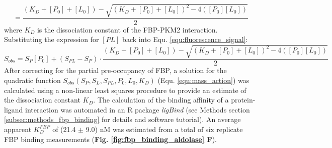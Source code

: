 %
%
\begin{equation}
[PL] = \frac{(K_{D} + [P_{0}] + [L_{0}]) - \sqrt{(K_{D} + [P_{0}] + [L_{0}])^{2} - 4([P_{0}] [L_{0}])}}{2}
\end{equation}
%
%
where $K_D$ is the dissociation constant of the FBP-PKM2 interaction. Substituting the expression for $[PL]$ back into Equ. \ref{equ:fluorescence_signal}:
\begin{equation}
S_{obs} = S_{P}[P_{0}] + (S_{PL} - S_{P}) \cdot \frac{(K_{D} + [P_{0}] + [L_{0}]) - \sqrt{(K_{D} + [P_{0}] + [L_{0}])^{2} - 4([P_{0}][L_{0}])}}{2}
\label{equ:mass_action}
\end{equation}
%
%
After correcting for the partial pre-occupancy of FBP, a solution for the quadratic function $S_{obs}(S_{P}, S_{L}, S_{PL}, P_{0}, L_{0}, K_{D})$ (Equ. \ref{equ:mass_action}) was calculated using a non-linear least squares procedure to provide an estimate of the dissociation constant $K_{D}$. The calculation of the binding affinity of a protein-ligand interaction was automated in an R package \textit{ligBind} (see Methods section \ref{subsec:methods_fbp_binding} for details and software tutorial). An average apparent $K_D^{FBP}$ of (21.4 $\pm$ 9.0) nM was estimated from a total of six replicate FBP binding measurements (\textbf{Fig. \ref{fig:fbp_binding_aldolase} F}).
%
%
%
%
